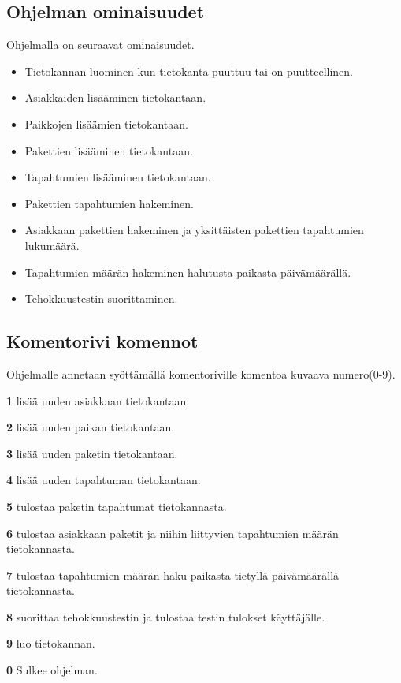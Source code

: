 \documentclass[11pt,a4paper]{article}
\begin{document}
\subsection*{Ohjelman ominaisuudet}
Ohjelmalla on seuraavat ominaisuudet.
\begin{itemize}
\item Tietokannan luominen kun tietokanta puuttuu tai on puutteellinen.
\item Asiakkaiden lisääminen tietokantaan.
\item Paikkojen lisäämien tietokantaan.
\item Pakettien lisääminen tietokantaan.
\item Tapahtumien lisääminen tietokantaan.
\item Pakettien tapahtumien hakeminen.
\item Asiakkaan pakettien hakeminen ja yksittäisten pakettien tapahtumien lukumäärä.
\item Tapahtumien määrän hakeminen halutusta paikasta päivämäärällä.
\item Tehokkuustestin suorittaminen.
\end{itemize}
\newpage
\subsection*{Komentorivi komennot}
Ohjelmalle annetaan syöttämällä komentoriville komentoa kuvaava numero(0-9).
\begin{description}
\item \textbf{1} lisää uuden asiakkaan tietokantaan.
\item \textbf{2} lisää uuden paikan tietokantaan.
\item \textbf{3} lisää uuden paketin tietokantaan.
\item \textbf{4} lisää uuden tapahtuman tietokantaan.
\item \textbf{5} tulostaa paketin tapahtumat tietokannasta.
\item \textbf{6} tulostaa asiakkaan paketit ja niihin liittyvien tapahtumien määrän tietokannasta.
\item \textbf{7} tulostaa tapahtumien määrän haku paikasta tietyllä päivämäärällä tietokannasta.
\item \textbf{8} suorittaa tehokkuustestin ja tulostaa testin tulokset käyttäjälle.
\item \textbf{9} luo tietokannan.
\item \textbf{0} Sulkee ohjelman.
\end{description}
\end{document}
